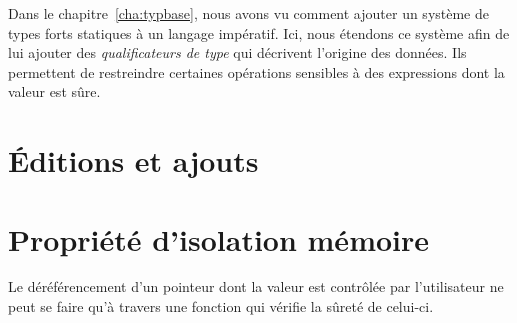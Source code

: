 Dans le chapitre~\ref{cha:typbase}, nous avons vu comment ajouter un système de
types forts statiques à un langage impératif. Ici, nous étendons ce système afin
de lui ajouter des \emph{qualificateurs de type} qui décrivent l'origine des
données. Ils permettent de restreindre certaines opérations sensibles à des
expressions dont la valeur est sûre.

\section{Éditions et ajouts}


\section{Propriété d'isolation mémoire}

Le déréférencement d'un pointeur dont la valeur est contrôlée par l'utilisateur
ne peut se faire qu'à travers une fonction qui vérifie la sûreté de celui-ci.
